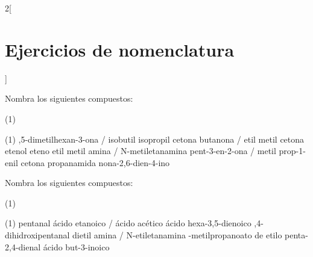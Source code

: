 \documentclass[10pt]{article}
\begin{document}
\begin{multicols}{2}[
  \section{Ejercicios de nomenclatura}
  ]
\begin{exercise}[
    tags    = {orgánica,formulación,múltiple,2B},
    topics  = {química orgánica,formulación,nomenclatura},
    source  = {Química 2B SAN 2016, p391, e13},
  ]
  Nombra los siguientes compuestos:

  \begin{tasks}(1)
    \task {}
    \task {}
    \task {}
    \task {}
    \task {}
    \task {}
    \task {}
    \task {}
  \end{tasks}
\end{exercise}

\begin{solution}
  \begin{tasks}(1)
    ,5-dimetilhexan-3-ona / isobutil isopropil cetona
    \task butanona / etil metil cetona
    \task etenol
    \task eteno
    \task etil metil amina / N-metiletanamina
    \task pent-3-en-2-ona / metil prop-1-enil cetona
    \task propanamida
    \task nona-2,6-dien-4-ino
  \end{tasks}
\end{solution}

\begin{exercise}[
    tags    = {orgánica,formulación,múltiple,2B},
    topics  = {química orgánica,formulación,nomenclatura},
    source  = {Química 2B SAN 2016, p391, e14},
  ]
  Nombra los siguientes compuestos:

  \begin{tasks}(1)
    \task {}
    \task {}
    \task {}
    \task {}
    \task {}
    \task {}
    \task {}
    \task {}
  \end{tasks}
\end{exercise}

\begin{solution}
  \begin{tasks}(1)
    \task pentanal
    \task ácido etanoico / ácido acético
    \task ácido hexa-3,5-dienoico
    ,4-dihidroxipentanal
    \task dietil amina / N-etiletanamina
    -metilpropanoato de etilo
    \task penta-2,4-dienal
    \task ácido but-3-inoico
  \end{tasks}
\end{solution}



\end{multicols}
\end{document}
